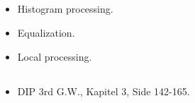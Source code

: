 \subsection{\subtopics}

\begin{itemize}
	\item Histogram processing.
	\item Equalization.
	\item Local processing.
\end{itemize}

\subsection{\curriculum}

\begin{itemize}
	\item DIP 3rd G.W., Kapitel 3, Side 142-165.
\end{itemize}